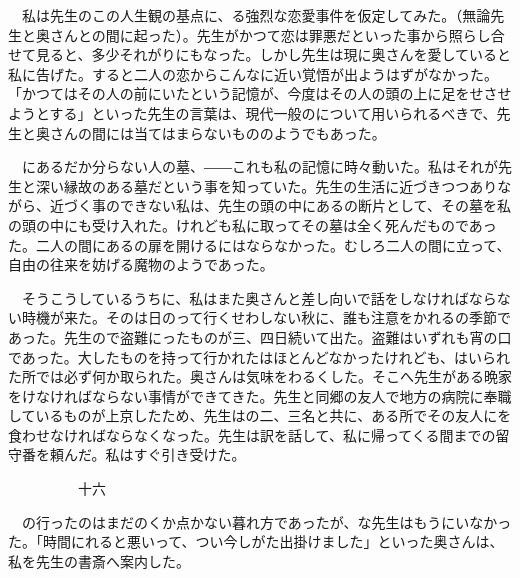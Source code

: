 \documentclass[a4j,onecolumn]{tarticle}
\begin{document}
　私は先生のこの人生観の基点に、\hbox{}る強烈な恋愛事件を仮定してみた。\hbox{}（無論先生と奥さんとの間に起った）。\hbox{}先生がかつて恋は罪悪だといった事から照らし合せて見ると、\hbox{}多少それがりにもなった。\hbox{}しかし先生は現に奥さんを愛していると私に告げた。\hbox{}すると二人の恋からこんなに近い覚悟が出ようはずがなかった。\hbox{}「かつてはその人の前にいたという記憶が、\hbox{}今度はその人の頭の上に足をせさせようとする」といった先生の言葉は、\hbox{}現代一般のについて用いられるべきで、\hbox{}先生と奥さんの間には当てはまらないもののようでもあった。\hbox{}\par{}
　にあるだか分らない人の墓、\hbox{}――これも私の記憶に時々動いた。\hbox{}私はそれが先生と深い縁故のある墓だという事を知っていた。\hbox{}先生の生活に近づきつつありながら、\hbox{}近づく事のできない私は、\hbox{}先生の頭の中にあるの断片として、\hbox{}その墓を私の頭の中にも受け入れた。\hbox{}けれども私に取ってその墓は全く死んだものであった。\hbox{}二人の間にあるの扉を開けるにはならなかった。\hbox{}むしろ二人の間に立って、\hbox{}自由の往来を妨げる魔物のようであった。\hbox{}\par{}
　そうこうしているうちに、\hbox{}私はまた奥さんと差し向いで話をしなければならない時機が来た。\hbox{}そのは日のって行くせわしない秋に、\hbox{}誰も注意をかれるの季節であった。\hbox{}先生ので盗難にったものが三、\hbox{}四日続いて出た。\hbox{}盗難はいずれも宵の口であった。\hbox{}大したものを持って行かれたはほとんどなかったけれども、\hbox{}はいられた所では必ず何か取られた。\hbox{}奥さんは気味をわるくした。\hbox{}そこへ先生がある晩家をけなければならない事情ができてきた。\hbox{}先生と同郷の友人で地方の病院に奉職しているものが上京したため、\hbox{}先生はの二、\hbox{}三名と共に、\hbox{}ある所でその友人にを食わせなければならなくなった。\hbox{}先生は訳を話して、\hbox{}私に帰ってくる間までの留守番を頼んだ。\hbox{}私はすぐ引き受けた。\hbox{}\par{}\par{}　　　　　十六
\par{}
　の行ったのはまだのくか点かない暮れ方であったが、\hbox{}な先生はもうにいなかった。\hbox{}「時間にれると悪いって、\hbox{}つい今しがた出掛けました」といった奥さんは、\hbox{}私を先生の書斎へ案内した。\hbox{}\par{}
\end{document}
